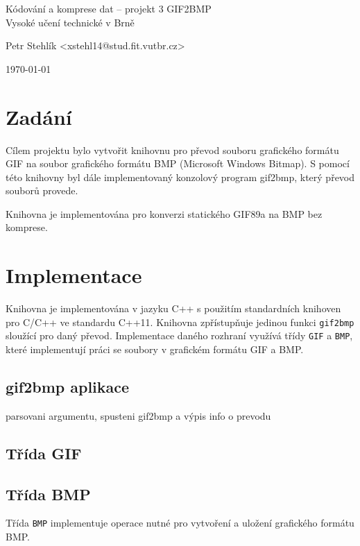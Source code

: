 \documentclass[11pt,a4paper]{article}
\begin{document}
\begin{center}
	\LARGE{Kódování a komprese dat -- projekt 3 GIF2BMP}\\
	\large{Vysoké učení technické v Brně}
	\vspace{0.5cm}

	Petr Stehlík <xstehl14@stud.fit.vutbr.cz>

	\vspace{0.5cm}

	\today

\end{center}

\section{Zadání}
Cílem projektu bylo vytvořit knihovnu pro převod souboru grafického formátu GIF na soubor grafického formátu BMP (Microsoft Windows Bitmap). S pomocí této knihovny byl dále implementovaný konzolový program gif2bmp, který převod souborů provede.

Knihovna je implementována pro konverzi statického GIF89a na BMP bez komprese.

\section{Implementace}
Knihovna je implementována v jazyku C++ s použitím standardních knihoven pro C/C++ ve standardu C++11. Knihovna zpřístupňuje jedinou funkci \texttt{gif2bmp} sloužící pro daný převod. Implementace daného rozhraní využívá třídy \texttt{GIF} a \texttt{BMP}, které implementují práci se soubory v grafickém formátu GIF a BMP.

\subsection{gif2bmp aplikace}

parsovani argumentu, spusteni gif2bmp a výpis info o prevodu

\subsection{Třída GIF}

\subsection{Třída BMP}

Třída \texttt{BMP} implementuje operace nutné pro vytvoření a uložení grafického formátu BMP.
\end{document}
